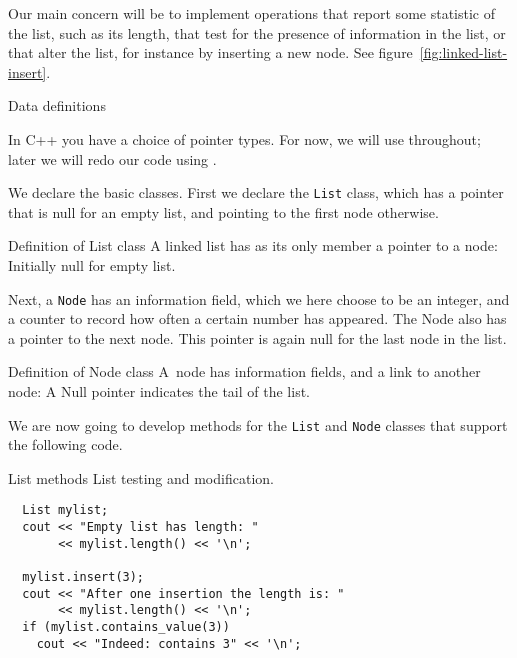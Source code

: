 Our main concern will be to implement operations that report some
statistic of the list, such as its length, that test for the presence
of information in the list, or that alter the list, for
instance by inserting a new node. See figure~\ref{fig:linked-list-insert}.

 {Data definitions}

In C++ you have a choice of pointer types. For now, we will use
 throughout; later we will redo our code
using .

We declare the basic classes.
First we declare the \lstinline{List} class,
which has a pointer that is null for an empty list,
and pointing to the first node otherwise.

\begin{block}{Definition of List class}
  \label{sl:list-class}
  A linked list has as its only member a pointer to a node:
  Initially null for empty list.
\end{block}

Next, a \lstinline{Node} has an information field, which we here choose to be an integer,
and a counter to record how often a certain number has appeared.
The Node also has a pointer to the next node.
This pointer is again null for the last node
in the list.

\begin{block}{Definition of Node class}
  \label{sl:node-class}
  A~node has information fields, and a
  link to another node:
  \lstset{numbers=left,numberstyle=\tiny}
  A Null pointer indicates the tail of the list.
\end{block}

We are now going to develop methods for the \lstinline{List} and \lstinline{Node}
classes that support the following code.

\begin{block}{List methods}
  \label{sl:list-node-funcs}
  List testing and modification.
\begin{lstlisting}
  List mylist;
  cout << "Empty list has length: "
       << mylist.length() << '\n';

  mylist.insert(3);
  cout << "After one insertion the length is: "
       << mylist.length() << '\n';
  if (mylist.contains_value(3))
    cout << "Indeed: contains 3" << '\n';
\end{lstlisting}
\end{block}

